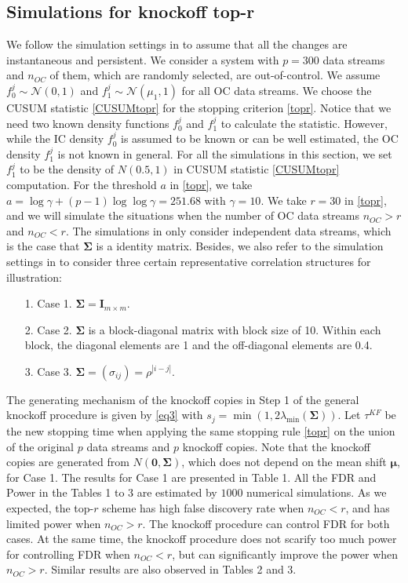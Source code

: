 \documentclass[]{interact}
\theoremstyle{plain}%
\theoremstyle{definition}
\theoremstyle{remark}
\providecommand{\tightlist}{%
  \setlength{\itemsep}{0pt}\setlength{\parskip}{0pt}}
\begin{document}
\subsection{Simulations for knockoff top-r}

We follow the simulation settings in \cite{mei2011quickest} to assume that all the changes are instantaneous and persistent. We consider a system with $p=300$ data streams and $n_{OC}$ of them, which are randomly selected, are out-of-control. We assume $f_0^j \sim \mathcal{N}(0,1)$ and $f_1^j \sim \mathcal{N}(\mu_1,1)$ for all OC data streams. We choose the CUSUM statistic \eqref{CUSUMtopr} for the stopping criterion \eqref{topr}. Notice that we need two known density functions $f_0^j$ and $f_1^j$ to calculate the statistic. However, while the IC density $f_0^j$ is assumed to be known or can be well estimated, the OC density $f_1^j$ is not known in general. For all the simulations in this section, we set $f_1^j$ to be the density of $N(0.5,1)$ in CUSUM statistic \eqref{CUSUMtopr} computation. For the threshold $a$ in \eqref{topr}, we take $a = \log\gamma + (p-1)\log\log\gamma=251.68$ with $\gamma=10$. We take $r=30$ in \eqref{topr}, and we will simulate the situations when the number of OC data streams $n_{OC}>r$ and $n_{OC}<r$. The simulations in \cite{mei2011quickest} only consider independent data streams, which is the case that $\bm \Sigma$ is a identity matrix. Besides, we also refer to the simulation settings in \cite{li2020diagnostic} to consider three certain representative correlation structures for illustration:
\begin{enumerate}
\tightlist
  \def\labelenumii{\alph{enumii}.}
\item[1.] Case 1. $\bm \Sigma=\bm I_{m\times m}$. 
\item[2.] Case 2.  $\bm \Sigma$ is a block-diagonal matrix with block size of 10. Within each block, the diagonal elements are 1 and the off-diagonal elements are 0.4.
\item[3.] Case 3.   $\bm \Sigma = (\sigma_{ij}) = \rho^{|i-j|}$.
\end{enumerate}
The generating mechanism of the knockoff copies in Step 1 of the general knockoff procedure is given by \eqref{eq3} with $s_j = \min \left(1, 2 \lambda_{\min}(\bm \Sigma)\right)$. Let $\tau^{KF}$ be the new stopping time when applying the same stopping rule \eqref{topr} on the union of the original $p$ data streams and $p$ knockoff copies. Note that the knockoff copies are generated from $N(\mathbf{0},\bm \Sigma)$, which does not depend on the mean shift $\bm\mu$, for Case 1. The results for Case 1 are presented in Table 1. All the FDR and Power in the Tables 1 to 3 are estimated by $1000$ numerical simulations. As we expected, the top-$r$ scheme has high false discovery rate when $n_{OC}<r$, and has limited power when $n_{OC}>r$. The knockoff procedure can control FDR for both cases. At the same time, the knockoff procedure does not scarify too much power for controlling FDR when $n_{OC}<r$, but can significantly improve the power when $n_{OC}>r$. Similar results are also observed in Tables 2 and 3.
\end{document}
